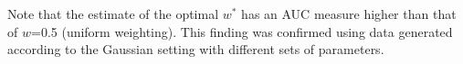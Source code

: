 \documentclass[12pt]{article} %
\begin{document}
Note that   the estimate of the optimal $w^{*}$  has  an AUC measure higher than  that of $w$=0.5 (uniform weighting). This finding was confirmed using data generated 
according to  the Gaussian setting with different sets of parameters.

\end{document}
